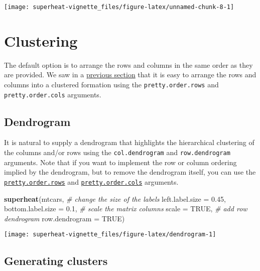\documentclass[]{book}
\newenvironment{Shaded}{\begin{snugshade}}{\end{snugshade}}
\newcommand{\KeywordTok}[1]{\textcolor[rgb]{0.13,0.29,0.53}{\textbf{{#1}}}}
\newcommand{\DataTypeTok}[1]{\textcolor[rgb]{0.13,0.29,0.53}{{#1}}}
\newcommand{\FloatTok}[1]{\textcolor[rgb]{0.00,0.00,0.81}{{#1}}}
\newcommand{\CommentTok}[1]{\textcolor[rgb]{0.56,0.35,0.01}{\textit{{#1}}}}
\newcommand{\OtherTok}[1]{\textcolor[rgb]{0.56,0.35,0.01}{{#1}}}
\newcommand{\NormalTok}[1]{{#1}}
\theoremstyle{definition}
\theoremstyle{definition}
\theoremstyle{remark}
\begin{document}
\begin{center}\texttt{[image: superheat-vignette\_files/figure-latex/unnamed-chunk-8-1]} \end{center}

\chapter{Clustering}\label{clustering}

The default option is to arrange the rows and columns in the same order
as they are provided. We saw in a \protect\hyperlink{h-order}{previous
section} that it is easy to arrange the rows and columns into a
clustered formation using the \texttt{pretty.order.rows} and
\texttt{pretty.order.cols} arguments.

\section{Dendrogram}\label{dendrogram}

It is natural to supply a dendrogram that highlights the hierarchical
clustering of the columns and/or rows using the \texttt{col.dendrogram}
and \texttt{row.dendrogram} arguments. Note that if you want to
implement the row or column ordering implied by the dendrogram, but to
remove the dendrogram itself, you can use the
\protect\hyperlink{h-order}{\texttt{pretty.order.rows}} and
\protect\hyperlink{h-order}{\texttt{pretty.order.cols}} arguments.

\begin{Shaded}
\begin{Highlighting}[]
\KeywordTok{superheat}\NormalTok{(mtcars,}
          \CommentTok{# change the size of the labels}
          \DataTypeTok{left.label.size =} \FloatTok{0.45}\NormalTok{,}
          \DataTypeTok{bottom.label.size =} \FloatTok{0.1}\NormalTok{,}
          \CommentTok{# scale the matrix columns}
          \DataTypeTok{scale =} \OtherTok{TRUE}\NormalTok{,}
          \CommentTok{# add row dendrogram}
          \DataTypeTok{row.dendrogram =} \OtherTok{TRUE}\NormalTok{)}
\end{Highlighting}
\end{Shaded}

\begin{center}\texttt{[image: superheat-vignette\_files/figure-latex/dendrogram-1]} \end{center}

\hypertarget{generate-clust}{\section{Generating
clusters}\label{generate-clust}}
\end{document}
